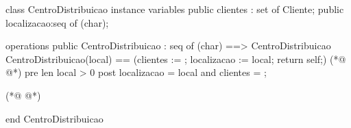 \begin{vdmpp}[breaklines=true]
class CentroDistribuicao
instance variables
 public clientes : set of Cliente;
  public localizacao:seq of (char);
 
operations
  public  CentroDistribuicao : seq of (char) ==> CentroDistribuicao
  CentroDistribuicao(local) == (clientes := {}; localizacao := local; return self;)
(*@
\label{CentroDistribuicao:9}
@*)
  pre len local > 0
  post localizacao = local and clientes = {};
 
 
(*@
\label{adicionaEncomenda:13}
@*)
 
end CentroDistribuicao
\end{vdmpp}
